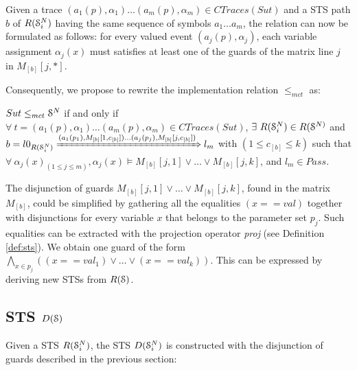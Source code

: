 Given a trace $(a_1(p), \alpha_1) \dots (a_m(p), \alpha_m) \in
CTraces({Sut})$ and a STS path $b$ of $R(\EuScript{S}_i^{N})$
having the same sequence of symbols $a_1 \dots a_m$, the relation
can now be formulated as follows: for every valued event
$(a_j(p), \alpha_j)$, each variable assignment $\alpha_j(x)$ must
satisfies at least one of the guards of the matrix line $j$ in
$M_{[b]}[j,*]$.

Consequently, we propose to rewrite the implementation relation
$\leq_{mct}$ as:

\begin{proposition}
    ${Sut} \leq_{mct} \EuScript{S}^{N}$ if and only if
    $\forall ~t = (a_1(p), \alpha_1) \dots (a_m(p), \alpha_m) \in
    CTraces({Sut})$, $\exists ~R(\EuScript{S}_i^{N}) \in
    R(\EuScript{S}^{N)}$ and
    $b = l0_{R(\EuScript{S}_i^{N})}
    \xRightarrow{(a_1(p_1),M_{[b]}[1,c_{[b]}]) \dots (a_j(p_j),M_{[b]}[j,c_{[b]}])}
    l_m$
    with $(1 \leq c_{[b]} \leq k)$ such that $\forall
    ~\alpha_j(x)_{(1 \leq j \leq m)}, \alpha_j(x) \models
    M_{[b]}[j,1] \vee \dots \vee  M_{[b]}[j,k]$, and $l_m \in Pass$.
\end{proposition}

The disjunction of guards $M_{[b]}[j,1] \vee \dots \vee
M_{[b]}[j,k]$, found in the matrix $M_{[b]}$, could be simplified
by gathering all the equalities $(x == val)$ together with
disjunctions for every variable $x$ that belongs to the parameter
set $p_j$. Such equalities can be extracted with the projection
operator \textit{proj} (see Definition \ref{def:sts}). We obtain
one guard of the form $\displaystyle \bigwedge_{x \in p_j} ((x ==
val_1) \vee \dots \vee (x == val_k))$. This can be expressed by
deriving new STSs from $R(\EuScript{S})$.

\subsection{STS $D(\EuScript{S})$}

Given a STS $R(\EuScript{S}_i^{N})$, the STS
$D(\EuScript{S}_i^{N})$ is constructed with the disjunction of
guards described in the previous section:

